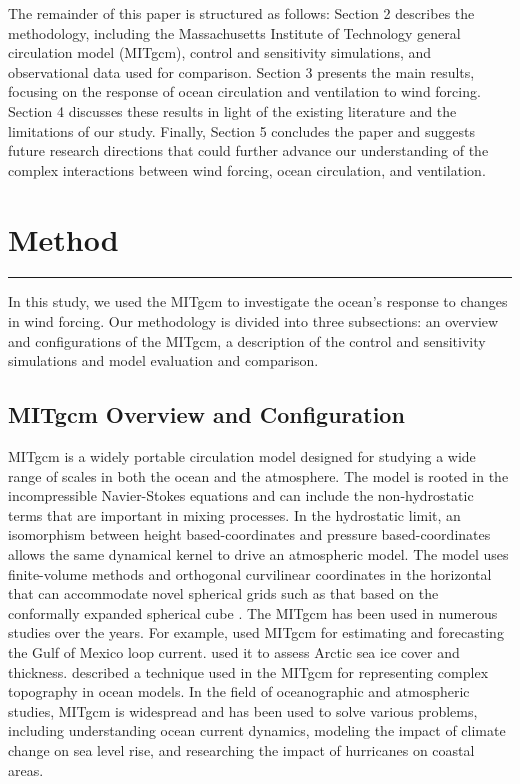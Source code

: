 \documentclass[12pt]{article}
\begin{document}
\noindent The remainder of this paper is structured as follows: Section 2 describes the methodology, including the Massachusetts Institute of Technology general circulation model (MITgcm), control and sensitivity simulations, and observational data used for comparison. Section 3 presents the main results, focusing on the response of ocean circulation and ventilation to wind forcing. Section 4 discusses these results in light of the existing literature and the limitations of our study. Finally, Section 5 concludes the paper and suggests future research directions that could further advance our understanding of the complex interactions between wind forcing, ocean circulation, and ventilation.

\newpage
\section{Method}
\rule{\textwidth}{0.4pt}
In this study, we used the MITgcm to investigate the ocean's response to changes in wind forcing.  Our methodology is divided into three subsections: an overview and configurations of the MITgcm, a description of the control and sensitivity simulations and model evaluation and comparison.

\subsection{MITgcm Overview and Configuration}
MITgcm is a widely portable circulation model designed for studying a wide range of scales in both the ocean and the atmosphere. The model is rooted in the incompressible Navier-Stokes equations and can include the non-hydrostatic terms that are important in mixing processes. In the hydrostatic limit, an isomorphism between height based-coordinates and pressure based-coordinates allows the same dynamical kernel to drive an atmospheric model. The model uses finite-volume methods and orthogonal curvilinear coordinates in the horizontal that can accommodate novel spherical grids such as that based on the conformally expanded spherical cube \citep{adcroft2018mitgcm}. The MITgcm has been used in numerous studies over the years. For example, \cite{gopalakrishnan2013state} used MITgcm for estimating and forecasting the Gulf of Mexico loop current. \cite{zheng2021evaluation} used it to assess Arctic sea ice cover and thickness. \cite{adcroft1997representation} described a technique used in the MITgcm for representing complex topography in ocean models. In the field of oceanographic and atmospheric studies, MITgcm is widespread and has been used to solve various problems, including understanding ocean current dynamics, modeling the impact of climate change on sea level rise, and researching the impact of hurricanes on coastal areas. \\
\end{document}
